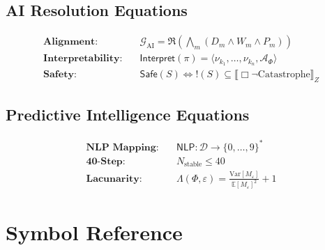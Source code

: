 \documentclass[11pt,twoside]{book}
\theoremstyle{definition}
\theoremstyle{plain}
\theoremstyle{remark}
\newcommand{\sem}[1]{\llbracket #1 \rrbracket}
\newcommand{\noe}[1]{\nu_{#1}}
\newcommand{\Frac}{\Phi}
\newcommand{\RPM}{\mathfrak{R}}
\newcommand{\FractalAttractor}{\mathcal{A}_\Phi}
\newcommand{\Lacunarity}{\Lambda}
\newcommand{\NLP}{\mathsf{NLP}}
\newcommand{\DigitalTrace}{\mathcal{D}}
\newcommand{\AIGoal}{\mathcal{G}_{\mathrm{AI}}}
\newcommand{\Interpret}{\mathsf{Interpret}}
\begin{document}
\section{AI Resolution Equations}

\begin{align}
    \textbf{Alignment:} \quad & \AIGoal = \RPM(\bigwedge_m (D_m \wedge W_m \wedge P_m)) \\
    \textbf{Interpretability:} \quad & \Interpret(\pi) = \langle \noe{k_1}, \ldots, \noe{k_n}, \FractalAttractor \rangle \\
    \textbf{Safety:} \quad & \mathsf{Safe}(S) \iff !(S) \subseteq \sem{\Box \neg \mathrm{Catastrophe}}_Z
\end{align}

\section{Predictive Intelligence Equations}

\begin{align}
    \textbf{NLP Mapping:} \quad & \NLP : \DigitalTrace \to \{0,\ldots,9\}^* \\
    \textbf{40-Step:} \quad & N_{\mathrm{stable}} \leq 40 \\
    \textbf{Lacunarity:} \quad & \Lacunarity(\Frac,\varepsilon) = \frac{\mathrm{Var}[M_\varepsilon]}{\mathbb{E}[M_\varepsilon]^2} + 1
\end{align}

\chapter{Symbol Reference}
\label{app:symbols}
\end{document}
